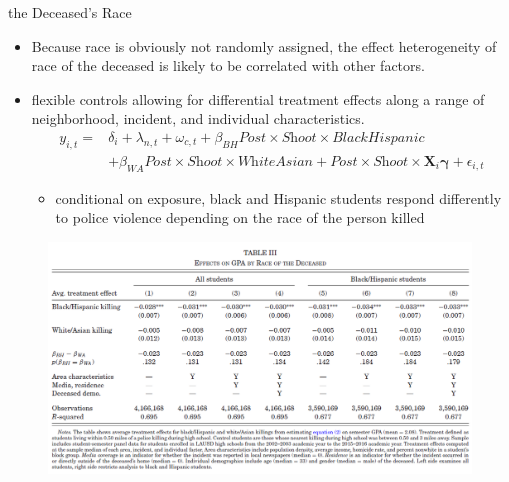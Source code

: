 \documentclass[dvipdfmx]{beamer}
\begin{document}
\begin{frame}{the Deceased's Race}
  \begin{itemize}
    \item Because race is obviously not randomly  assigned, the effect heterogeneity of race of the deceased is likely to be correlated with other factors.
    \item flexible controls allowing for differential treatment effects along a range of neighborhood, incident, and individual characteristics.
    \begin{align*}
      y_{i, t} = & \delta_i + \lambda_{n, t} + \omega_{c, t} + \beta_{BH} \textit{Post} \times \textit{Shoot} \times \textit{BlackHispanic} \\
      &+ \beta_{WA} \textit{Post} \times \textit{Shoot} \times \textit{WhiteAsian} + \textit{Post} \times \textit{Shoot} \times \mathbf{X}_i \boldsymbol{\gamma} + \epsilon_{i, t}
    \end{align*}
    \begin{itemize}
      \item conditional on exposure, black and Hispanic students respond differently to police violence depending on the race of the person killed
    \end{itemize}
  \end{itemize}
\end{frame}

\begin{frame}{}
  \begin{figure}
    \centering
    \includegraphics[scale = .55]{fig_tab/os20220113/T3}
  \end{figure}
\end{frame}
\end{document}
